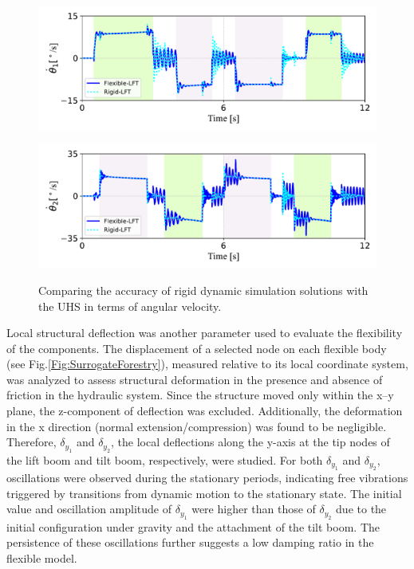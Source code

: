 \begin{figure}[ht]
    \centering
    \begin{minipage}{\textwidth}
        \centering
        \includegraphics[width=\textwidth]{LiftVelocity.pdf}
         \label{LiftVelocity}
    \end{minipage}
    \vspace{1em}  %
    \begin{minipage}{\textwidth}
        \centering
        \includegraphics[width=\textwidth]{TiltVelocity.pdf}
         \label{TiltVelocity}
    \end{minipage}
    \caption{Comparing the accuracy of rigid dynamic simulation solutions with the UHS in terms of angular velocity.}
    \label{Velocity}
\end{figure}

Local structural deflection was another parameter used to evaluate the flexibility of the components. The displacement of a selected node on each flexible body (see Fig.\ref{Fig:SurrogateForestry}), measured relative to its local coordinate system, was analyzed to assess structural deformation in the presence and absence of friction in the hydraulic system. Since the structure moved only within the x–y plane, the z-component of deflection was excluded.  Additionally, the deformation in the x direction (normal extension/compression) was found to be negligible. Therefore, $\delta_{y_1}$ and $\delta_{y_2}$, the local deflections along the y-axis at the tip nodes of the lift boom and tilt boom, respectively, were studied. For both $\delta_{y_1}$ and $\delta_{y_2}$, oscillations were observed during the stationary periods, indicating free vibrations triggered by transitions from dynamic motion to the stationary state. The initial value and oscillation amplitude of $\delta_{y_1}$ were higher than those of $\delta_{y_2}$ due to the initial configuration under gravity and the attachment of the tilt boom. The persistence of these oscillations further suggests a low damping ratio in the flexible model.

